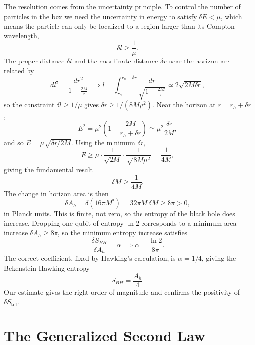The resolution comes from the uncertainty principle. To control the
number of particles in the box we need the uncertainty in energy to
satisfy $\delta E < \mu$, which means the particle can only be
localized to a region larger than its Compton wavelength,
\begin{equation}
	\delta l \geq \frac{1}{\mu}.
\end{equation}
The proper distance $\delta l$ and the coordinate distance $\delta r$
near the horizon are related by
\begin{equation}
	dl^2 = \frac{dr^2}{1-\frac{2M}{r}}
	\implies l = \int_{r_h}^{r_h+\delta r}
	\frac{dr}{\sqrt{1-\frac{2M}{r}}}
	\simeq 2\sqrt{2M\delta r},
\end{equation}
so the constraint $\delta l \geq 1/\mu$ gives
$\delta r \geq 1/(8M\mu^2)$. Near the horizon at
$r = r_h + \delta r$,
\begin{equation}
	E^2 = \mu^2\left(1-\frac{2M}{r_h+\delta r}\right)
	\simeq \mu^2\frac{\delta r}{2M},
\end{equation}
and so $E = \mu\sqrt{\delta r/2M}$. Using the minimum $\delta r$,
\begin{equation}
	E \geq \mu\cdot\frac{1}{\sqrt{2M}}\cdot
	\frac{1}{\sqrt{8M\mu^2}} = \frac{1}{4M},
\end{equation}
giving the fundamental result
\begin{equation}
	\boxed{\delta M \geq \frac{1}{4M}.}
\end{equation}
The change in horizon area is then
\begin{equation}
	\delta A_h = \delta(16\pi M^2)
	= 32\pi M\,\delta M \geq 8\pi > 0,
\end{equation}
in Planck units. This is finite, not zero, so the entropy of the black
hole does increase. Dropping one qubit of entropy $\ln 2$ corresponds
to a minimum area increase $\delta A_h \geq 8\pi$, so the minimum
entropy increase satisfies
\begin{equation}
	\frac{\delta S_{BH}}{\delta A_h} = \alpha
	\implies \alpha = \frac{\ln 2}{8\pi}.
\end{equation}
The correct coefficient, fixed by Hawking's calculation, is
$\alpha = 1/4$, giving the Bekenstein-Hawking entropy
\begin{equation}
	\boxed{S_{BH} = \frac{A_h}{4}.}
\end{equation}
Our estimate gives the right order of magnitude and confirms the
positivity of $\delta S_{\text{tot}}$.

\section{The Generalized Second Law}

